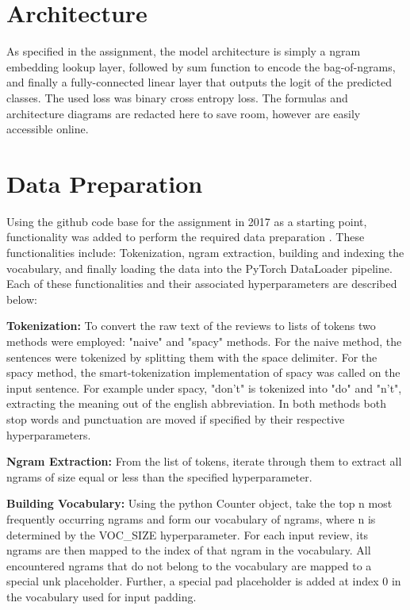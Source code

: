 \documentclass[a4paper,10pt]{article}
\begin{document}
\section{Architecture}
As specified in the assignment, the model architecture is simply a ngram embedding lookup layer, followed by sum function to encode the bag-of-ngrams, and finally a fully-connected linear layer that outputs the logit of the predicted classes. The used loss was binary cross entropy loss. The formulas and architecture diagrams are redacted here to save room, however are easily accessible online.

\section{Data Preparation}
\par
\justify
Using the github code base for the assignment in 2017 as a starting point, functionality was added to perform the required data preparation \cite{repo2017}. These functionalities include: Tokenization, ngram extraction, building and indexing the vocabulary, and finally loading the data into the PyTorch DataLoader pipeline. Each of these functionalities and their associated hyperparameters are described below:

\par
\justify
\textbf{Tokenization:} To convert the raw text of the reviews to lists of tokens two methods were employed: "naive" and "spacy" \cite{repospacy} methods. For the naive method, the sentences were tokenized by splitting them with the space delimiter. For the spacy method, the smart-tokenization implementation of spacy was called on the input sentence. For example under spacy, "don't" is tokenized into "do" and "n't", extracting the meaning out of the english abbreviation. In both methods both stop words and punctuation are moved if specified by their respective hyperparameters.

\par
\justify
\textbf{Ngram Extraction:} From the list of tokens, iterate through them to extract all ngrams of size equal or less than the specified hyperparameter. 

\par
\justify
\textbf{Building Vocabulary:} Using the python Counter object, take the top n most frequently occurring ngrams and form our vocabulary of ngrams, where n is determined by the VOC\_SIZE hyperparameter. For each input review, its ngrams are then mapped to the index of that ngram in the vocabulary. All encountered ngrams that do not belong to the vocabulary are mapped to a special \textlangle{}unk\textrangle{} placeholder. Further, a special \textlangle{}pad\textrangle{} placeholder is added at index 0 in the vocabulary used for input padding.
\end{document}
